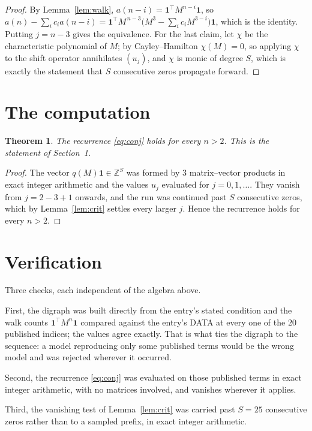 \documentclass[11pt,a4paper]{article}
\theoremstyle{plain}
\newtheorem{theorem}{Theorem}
\theoremstyle{definition}
\begin{document}
\begin{proof}
By Lemma~\ref{lem:walk}, $a(n-i)=\mathbf{1}^{\!\top}M^{n-i}\mathbf{1}$, so
$a(n)-\sum_i c_i a(n-i)
=\mathbf{1}^{\!\top}M^{\,n-3}\bigl(M^{3}-\sum_i c_i M^{3-i}\bigr)
\mathbf{1}$, which is the identity. Putting $j=n-3$ gives the equivalence. For the
last claim, let $\chi$ be the characteristic polynomial of $M$; by Cayley--Hamilton
$\chi(M)=0$, so applying $\chi$ to the shift operator annihilates $(u_j)$, and $\chi$ is
monic of degree $S$, which is exactly the statement that $S$ consecutive zeros propagate
forward.
\end{proof}

\section{The computation}

\begin{theorem}
The recurrence \eqref{eq:conj} holds for every $n>2$. This is the statement of
Section~1.
\end{theorem}

\begin{proof}
The vector $q(M)\mathbf{1}\in\mathbb{Z}^{S}$ was formed by $3$ matrix--vector
products in exact integer arithmetic and the values $u_j$ evaluated for
$j=0,1,\dots$. They vanish from $j=2-3+1$ onwards, and the run was continued past
$S$ consecutive zeros, which by Lemma~\ref{lem:crit} settles every larger $j$. Hence the
recurrence holds for every $n>2$.
\end{proof}

\section{Verification}

Three checks, each independent of the algebra above.

First, the digraph was built directly from the entry's stated condition and the walk counts
$\mathbf{1}^{\!\top}M^{n}\mathbf{1}$ compared against the entry's DATA at every one of
the $20$ published indices; the values agree exactly. That is what ties the digraph to
the sequence: a model reproducing only some published terms would be the wrong model and
was rejected wherever it occurred.

Second, the recurrence \eqref{eq:conj} was evaluated on those published terms in exact
integer arithmetic, with no matrices involved, and vanishes wherever it applies.

Third, the vanishing test of Lemma~\ref{lem:crit} was carried past $S=25$ consecutive
zeros rather than to a sampled prefix, in exact integer arithmetic.
\end{document}

